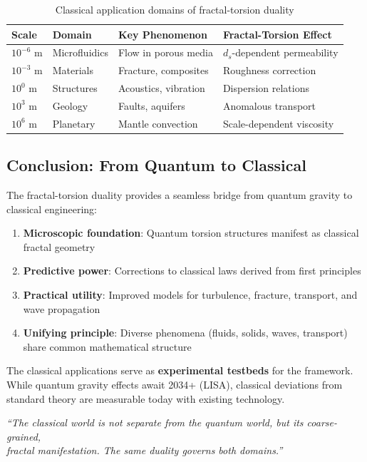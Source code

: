 \begin{table}[h]
\centering
\begin{tabular}{p{3cm}p{3cm}p{4cm}p{3cm}}
\toprule
\textbf{Scale} & \textbf{Domain} & \textbf{Key Phenomenon} & \textbf{Fractal-Torsion Effect} \\
\midrule
$10^{-6}$ m & Microfluidics & Flow in porous media & $d_s$-dependent permeability \\
$10^{-3}$ m & Materials & Fracture, composites & Roughness correction \\
$10^{0}$ m & Structures & Acoustics, vibration & Dispersion relations \\
$10^{3}$ m & Geology & Faults, aquifers & Anomalous transport \\
$10^{6}$ m & Planetary & Mantle convection & Scale-dependent viscosity \\
\bottomrule
\end{tabular}
\caption{Classical application domains of fractal-torsion duality}
\end{table}

\subsection{Conclusion: From Quantum to Classical}

The fractal-torsion duality provides a seamless bridge from quantum gravity to classical engineering:

\begin{enumerate}
    \item \textbf{Microscopic foundation}: Quantum torsion structures manifest as classical fractal geometry
    \item \textbf{Predictive power}: Corrections to classical laws derived from first principles
    \item \textbf{Practical utility}: Improved models for turbulence, fracture, transport, and wave propagation
    \item \textbf{Unifying principle}: Diverse phenomena (fluids, solids, waves, transport) share common mathematical structure
\end{enumerate}

The classical applications serve as \textbf{experimental testbeds} for the framework. While quantum gravity effects await 2034+ (LISA), classical deviations from standard theory are measurable today with existing technology.

\begin{flushright}
\textit{``The classical world is not separate from the quantum world, but its coarse-grained, \\fractal manifestation. The same duality governs both domains.''}
\end{flushright}
